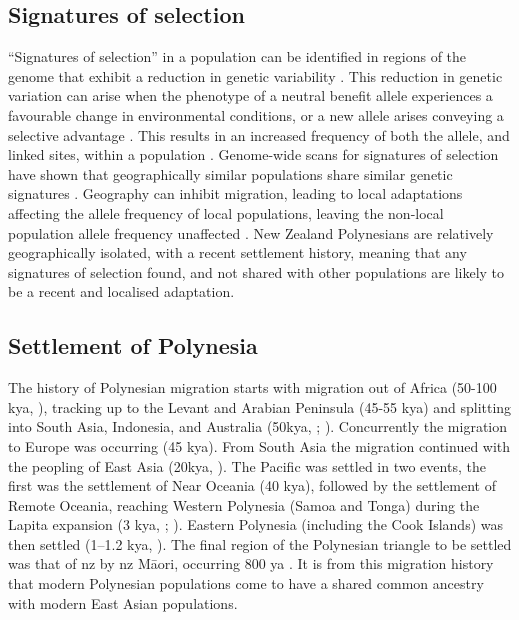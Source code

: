 \documentclass[twoside,openright]{report}
\newcommand{\tex}[1]{#1}
\begin{document}
\subsection{Signatures of selection}\label{signatures-of-selection}

``Signatures of selection'' in a population can be identified in regions
of the genome that exhibit a reduction in genetic variability
\citep{Smith1974, Kaplan1989, McVean2007}. This reduction in genetic
variation can arise when the phenotype of a neutral benefit allele
experiences a favourable change in environmental conditions, or a new
allele arises conveying a selective advantage \citep{Hermisson2005}.
This results in an increased frequency of both the allele, and linked
sites, within a population \citep{Smith1974}. Genome-wide scans for
signatures of selection have shown that geographically similar
populations share similar genetic signatures
\citep{Coop2009, pickrell2009signals}. Geography can inhibit migration,
leading to local adaptations affecting the allele frequency of local
populations, leaving the non-local population allele frequency
unaffected \citep{Coop2009}. New Zealand Polynesians are relatively
geographically isolated, with a recent settlement history, meaning that
any signatures of selection found, and not shared with other populations
are likely to be a recent and localised adaptation.

\subsection{Settlement of Polynesia}\label{settlement-of-polynesia-1}

The history of Polynesian migration starts with migration out of Africa
(50-100 kya, \citet{Nielsen2017}), tracking up to the Levant and Arabian
Peninsula (45-55 kya) and splitting into South Asia, Indonesia, and
Australia (50kya, \citet{Kivisild1999}; \citet{Quintana-Murci1999}).
Concurrently the migration to Europe was occurring (45 kya). From South
Asia the migration continued with the peopling of East Asia (20kya,
\citet{Groucutt2015}). The Pacific was settled in two events, the first
was the settlement of Near Oceania (40 kya), followed by the settlement
of Remote Oceania, reaching Western Polynesia (Samoa and Tonga) during
the Lapita expansion (3 kya, \citet{Matisoo-Smith2015};
\citet{Skoglund2016}). Eastern Polynesia (including the Cook Islands)
was then settled (1--1.2 kya, \citet{Wilmshurst2011}). The final region
of the Polynesian triangle to be settled was that of \gls{nz} by
\gls{nz} M\tex{\={a}}ori, occurring 800 ya
\citep{Duggan2014, Matisoo-Smith2015}. It is from this migration history
that modern Polynesian populations come to have a shared common ancestry
with modern East Asian populations.
\end{document}
